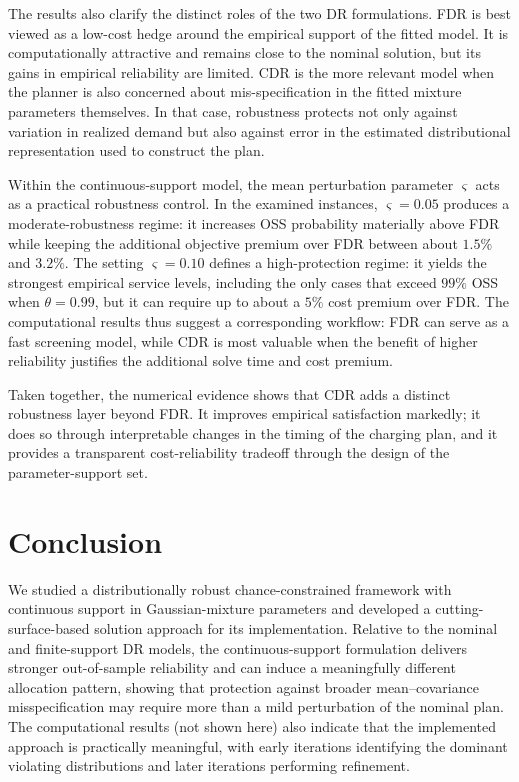 \documentclass[opre,sglanonrev]{informs4}
\begin{document}
{The results also clarify the distinct roles of the two DR formulations. FDR is best viewed as a low-cost hedge around the empirical support of the fitted model. It is computationally attractive and remains close to the nominal solution, but its gains in empirical reliability are limited. CDR is the more relevant model when the planner is also concerned about mis-specification in the fitted mixture parameters themselves. In that case, robustness protects not only against variation in realized demand but also against error in the estimated distributional representation used to construct the plan.

Within the continuous-support model, the mean perturbation parameter \(\varsigma\) acts as a practical robustness control. In the examined instances, \(\varsigma=0.05\) produces a moderate-robustness regime: it increases OSS probability materially above FDR while keeping the additional objective premium over FDR between about \(1.5\%\) and \(3.2\%\). The setting \(\varsigma=0.10\) defines a high-protection regime: it yields the strongest empirical service levels, including the only cases that exceed \(99\%\) OSS when \(\theta=0.99\), but it can require up to about a \(5\%\) cost premium over FDR. The computational results thus suggest a corresponding workflow: FDR can serve as a fast screening model, while CDR is most valuable when the benefit of higher reliability justifies the additional solve time and cost premium.

Taken together, the numerical evidence shows that CDR adds a distinct robustness layer beyond FDR. It improves empirical satisfaction markedly; it does so through interpretable changes in the timing of the charging plan, and it provides a transparent cost-reliability tradeoff through the design of the parameter-support set.


\section{Conclusion}
We studied a distributionally robust chance-constrained framework with continuous support in Gaussian-mixture parameters and developed a cutting-surface-based solution approach for its implementation. Relative to the nominal and finite-support DR models, the continuous-support formulation delivers stronger out-of-sample reliability and can induce a meaningfully different allocation pattern, showing that protection against broader mean--covariance misspecification may require more than a mild perturbation of the nominal plan. The computational results (not shown here) also indicate that the implemented approach is practically meaningful, with early iterations identifying the dominant violating distributions and later iterations performing refinement.

}
\end{document}
